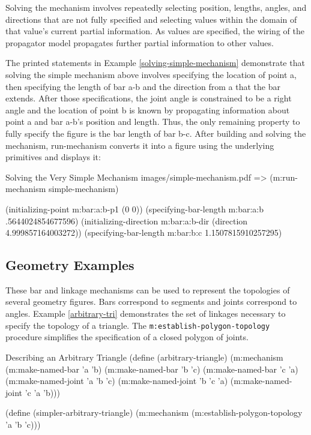 Solving the mechanism involves repeatedly selecting position, lengths,
angles, and directions that are not fully specified and selecting
values within the domain of that value's current partial
information. As values are specified, the wiring of the propagator
model propagates further partial information to other values.

The printed statements in Example \ref{solving-simple-mechanism}
demonstrate that solving the simple mechanism above involves
specifying the location of point a, then specifying the length of bar
a-b and the direction from a that the bar extends. After those
specifications, the joint angle is constrained to be a right angle and
the location of point b is known by propagating information about
point a and bar a-b's position and length. Thus, the only remaining
property to fully specify the figure is the bar length of bar
b-c. After building and solving the mechanism, run-mechanism converts
it into a figure using the underlying primitives and displays it:

\begin{pdf-example}
[label=solving-simple-mechanism]
{Solving the Very Simple Mechanism}
{images/simple-mechanism.pdf}
=> (m:run-mechanism simple-mechanism)

(initializing-point m:bar:a:b-p1 (0 0))
(specifying-bar-length m:bar:a:b .5644024854677596)
(initializing-direction m:bar:a:b-dir (direction 4.999857164003272))
(specifying-bar-length m:bar:b:c 1.1507815910257295)
\end{pdf-example}

\subsection{Geometry Examples}

These bar and linkage mechanisms can be used to represent the
topologies of several geometry figures. Bars correspond to segments
and joints correspond to angles. Example \ref{arbitrary-tri}
demonstrates the set of linkages necessary to specify the topology of
a triangle. The \texttt{m:establish-polygon-topology} procedure
simplifies the specification of a closed polygon of joints.

\begin{code-example}
[label=arbitrary-tri]
{Describing an Arbitrary Triangle}
(define (arbitrary-triangle)
  (m:mechanism
   (m:make-named-bar 'a 'b)
   (m:make-named-bar 'b 'c)
   (m:make-named-bar 'c 'a)
   (m:make-named-joint 'a 'b 'c)
   (m:make-named-joint 'b 'c 'a)
   (m:make-named-joint 'c 'a 'b)))

(define (simpler-arbitrary-triangle)
  (m:mechanism
   (m:establish-polygon-topology 'a 'b 'c)))
\end{code-example}

